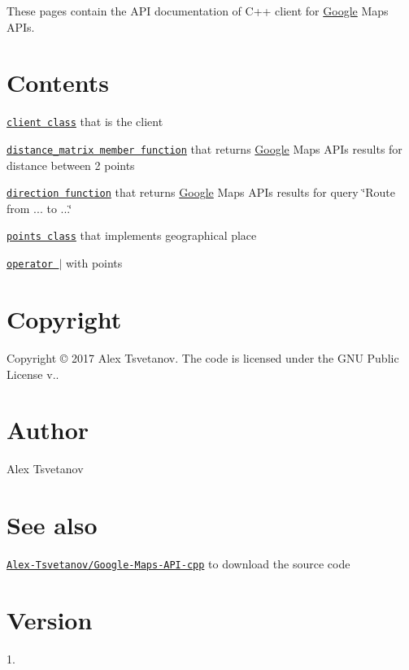 \href{https://rawgit.com/Alex-Tsvetanov/Google-Maps-API-cpp/master/doc/html/index.html}{\tt } \href{https://github.com/Alex-Tsvetanov/Google-Maps-API-cpp/blob/master/LICENSE}{\tt } \href{https://github.com/Alex-Tsvetanov/Google-Maps-API-cpp/releases}{\tt } \href{http://github.com/Alex-Tsvetanov/Google-Maps-API-cpp/issues}{\tt } \href{http://isitmaintained.com/project/Alex-Tsvetanov/Google-Maps-API-cpp}{\tt } \href{https://bestpractices.coreinfrastructure.org/projects/980}{\tt }

These pages contain the A\+PI documentation of C++ client for \hyperlink{a00038}{Google} Maps A\+P\+Is.

\section*{Contents}


\begin{DoxyItemize}
\item \href{./}{\tt client class} that is the client
\begin{DoxyItemize}
\item \href{./}{\tt distance\+\_\+matrix member function} that returns \hyperlink{a00038}{Google} Maps A\+P\+Is results for distance between 2 points
\item \href{./}{\tt direction function} that returns \hyperlink{a00038}{Google} Maps A\+P\+Is results for query \char`\"{}\+Route from ... to ...\char`\"{}
\end{DoxyItemize}
\item \href{./}{\tt points class} that implements geographical place
\begin{DoxyItemize}
\item \href{./}{\tt operator $\vert$} with points
\end{DoxyItemize}
\end{DoxyItemize}

\section*{Copyright}

Copyright © 2017 Alex Tsvetanov. The code is licensed under the G\+NU Public License v..

\section*{Author}

Alex Tsvetanov

\section*{See also}

\href{https://github.com/Alex-Tsvetanov/Google-Maps-API-cpp}{\tt Alex-\/\+Tsvetanov/\+Google-\/\+Maps-\/\+A\+P\+I-\/cpp} to download the source code

\section*{Version}

1. 